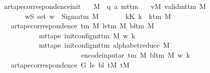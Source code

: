 \begin{isabellebody}
\isamarkupfalse%
\ ar{\isacharunderscore}{\kern0pt}tape{\isacharunderscore}{\kern0pt}correspondence{\isacharunderscore}{\kern0pt}init{\isacharcolon}{\kern0pt}\isanewline
\ \ \ M\ {\isacharcolon}{\kern0pt}{\isacharcolon}{\kern0pt}\ {\isachardoublequoteopen}{\isacharparenleft}{\kern0pt}{\isacharprime}{\kern0pt}q{\isacharcomma}{\kern0pt}\ {\isacharprime}{\kern0pt}a{\isacharparenright}{\kern0pt}\ mttm{\isachardoublequoteclose}\isanewline
\ \ \ vM{\isacharcolon}{\kern0pt}\ {\isachardoublequoteopen}valid{\isacharunderscore}{\kern0pt}mttm\ M{\isachardoublequoteclose}\isanewline
\ \ \ \ \ \ \ wS{\isacharcolon}{\kern0pt}\ {\isachardoublequoteopen}set\ w\ {\isasymsubseteq}\ Sigma{\isacharunderscore}{\kern0pt}tm\ M{\isachardoublequoteclose}\isanewline
\ \ \ \ \ \ \ kK{\isacharcolon}{\kern0pt}\ {\isachardoublequoteopen}k\ {\isacharless}{\kern0pt}\ k{\isacharunderscore}{\kern0pt}tm\ M{\isachardoublequoteclose}\isanewline
\ \ \ {\isachardoublequoteopen}ar{\isacharunderscore}{\kern0pt}tape{\isacharunderscore}{\kern0pt}correspondence\ {\isacharparenleft}{\kern0pt}{\isasymGamma}{\isacharunderscore}{\kern0pt}tm\ M{\isacharparenright}{\kern0pt}\ {\isacharparenleft}{\kern0pt}le{\isacharunderscore}{\kern0pt}tm\ M{\isacharparenright}{\kern0pt}\ {\isacharparenleft}{\kern0pt}bl{\isacharunderscore}{\kern0pt}tm\ M{\isacharparenright}{\kern0pt}\isanewline
\ \ \ \ \ \ \ \ \ \ \ {\isacharparenleft}{\kern0pt}mt{\isacharunderscore}{\kern0pt}tape\ {\isacharparenleft}{\kern0pt}init{\isacharunderscore}{\kern0pt}config{\isacharunderscore}{\kern0pt}mttm\ M\ w{\isacharparenright}{\kern0pt}\ k{\isacharparenright}{\kern0pt}\isanewline
\ \ \ \ \ \ \ \ \ \ \ {\isacharparenleft}{\kern0pt}mt{\isacharunderscore}{\kern0pt}tape\ {\isacharparenleft}{\kern0pt}init{\isacharunderscore}{\kern0pt}config{\isacharunderscore}{\kern0pt}mttm\ {\isacharparenleft}{\kern0pt}alphabet{\isacharunderscore}{\kern0pt}reduce\ M{\isacharparenright}{\kern0pt}\isanewline
\ \ \ \ \ \ \ \ \ \ \ \ \ \ \ \ \ \ \ \ \ \ \ {\isacharparenleft}{\kern0pt}encode{\isacharunderscore}{\kern0pt}input{\isacharunderscore}{\kern0pt}ar\ {\isacharparenleft}{\kern0pt}{\isasymGamma}{\isacharunderscore}{\kern0pt}tm\ M{\isacharparenright}{\kern0pt}\ {\isacharparenleft}{\kern0pt}bl{\isacharunderscore}{\kern0pt}tm\ M{\isacharparenright}{\kern0pt}\ w{\isacharparenright}{\kern0pt}{\isacharparenright}{\kern0pt}\ k{\isacharparenright}{\kern0pt}{\isachardoublequoteclose}\isanewline
\ \ {\isacharparenleft}{\kern0pt}\ {\isachardoublequoteopen}ar{\isacharunderscore}{\kern0pt}tape{\isacharunderscore}{\kern0pt}correspondence\ {\isacharquery}{\kern0pt}G\ {\isacharquery}{\kern0pt}le\ {\isacharquery}{\kern0pt}bl\ {\isacharquery}{\kern0pt}tM\ {\isacharquery}{\kern0pt}tM{\isacharprime}{\kern0pt}{\isachardoublequoteclose}{\isacharparenright}{\kern0pt}\isanewline

\end{isabellebody}

